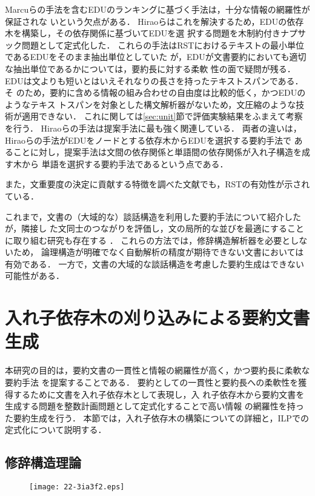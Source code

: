 \documentclass[japanese]{jnlp_1.4}
\begin{document}
Marcuらの手法を含むEDUのランキングに基づく手法は，十分な情報の網羅性が保証されな
いという欠点がある．
Hiraoらはこれを解決するため，EDUの依存木を構築し，その依存関係に基づいてEDUを選
択する問題を木制約付きナプサック問題として定式化した\cite{hirao:13}．
これらの手法はRSTにおけるテキストの最小単位であるEDUをそのまま抽出単位としていた
が，EDUが文書要約においても適切な抽出単位であるかについては，要約長に対する柔軟
性の面で疑問が残る．
EDUは文よりも短いとはいえそれなりの長さを持ったテキストスパンである．そ
のため，要約に含める情報の組み合わせの自由度は比較的低く，かつEDUのようなテキス
トスパンを対象とした構文解析器がないため，文圧縮のような技術が適用できない．
これに関しては\ref{sec:unit}節で評価実験結果をふまえて考察を行う．
Hiraoらの手法は提案手法に最も強く関連している．
両者の違いは，Hiraoらの手法がEDUをノードとする依存木からEDUを選択する要約手法で
あることに対し，提案手法は文間の依存関係と単語間の依存関係が入れ子構造を成す木から
単語を選択する要約手法であるという点である．

また，文重要度の決定に貢献する特徴を調べた文献\cite{louis:10}でも，RSTの有効性が示されている．

これまで，文書の（大域的な）談話構造を利用した要約手法について紹介したが，隣接し
た文同士のつながりを評価し，文の局所的な並びを最適にすることに取り組む研究も存在する
\cite{nishikawa:10,christensen:13}．
これらの方法では，修辞構造解析器を必要としないため，
論理構造が明確でなく自動解析の精度が期待できない文書においては有効である．
一方で，文書の大域的な談話構造を考慮した要約生成はできない可能性がある．



\section{入れ子依存木の刈り込みによる要約文書生成}

本研究の目的は，要約文書の一貫性と情報の網羅性が高く，かつ要約長に柔軟な要約手法
を提案することである．
要約としての一貫性と要約長への柔軟性を獲得するために文書を入れ子依存木として表現し，入
れ子依存木から要約文書を生成する問題を整数計画問題として定式化することで高い情報
の網羅性を持った要約生成を行う．
本節では，入れ子依存木の構築についての詳細と，ILPでの定式化について説明する．


\subsection{修辞構造理論}

\begin{figure}[b]
\begin{center}
\texttt{[image: 22-3ia3f2.eps]}
\end{center}
\label{fig:rstdt}
\end{figure}
\end{document}
